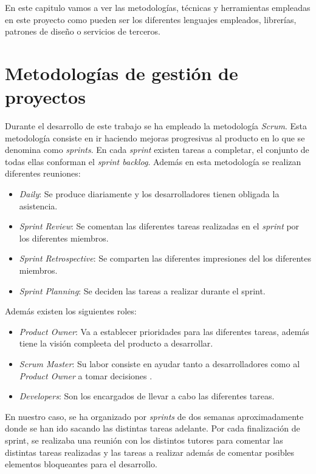 
En este capitulo vamos a ver las metodologías, técnicas y herramientas empleadas en este proyecto como pueden ser los diferentes lenguajes empleados, librerías, patrones de diseño o servicios de terceros.

\section{Metodologías de gestión de proyectos}

Durante el desarrollo de este trabajo se ha empleado la metodología \textit{Scrum}\cite{sachdeva2016scrum}. Esta metodología consiste en ir haciendo mejoras progresivas al producto en lo que se denomina como \textit{sprints}. En cada \textit{sprint} existen tareas a completar, el conjunto de todas ellas conforman el \textit{sprint backlog}. Además en esta metodología se realizan diferentes reuniones:
\begin{itemize}
    \item  \textit{Daily}: Se produce diariamente y los desarrolladores tienen obligada la asistencia.
    \item  \textit{Sprint Review}: Se comentan las diferentes tareas realizadas en el \textit{sprint} por los diferentes miembros.
    \item  \textit{Sprint Retrospective}: Se comparten las diferentes impresiones del los diferentes miembros.
    \item  \textit{Sprint Planning}: Se deciden las tareas a realizar durante el sprint.
\end{itemize}

Además existen los siguientes roles:
\begin{itemize}
    \item  \textit{Product Owner}: Va a establecer prioridades para las diferentes tareas, además tiene la visión compleeta del producto a desarrollar.
    \item  \textit{Scrum Master}: Su labor consiste en ayudar tanto a desarrolladores como al \textit{Product Owner} a tomar decisiones .
    \item  \textit{Developers}: Son los encargados de llevar a cabo las diferentes tareas.
\end{itemize}

En nuestro caso, se ha organizado por \textit{sprints} de dos semanas aproximadamente donde se han ido sacando las distintas tareas adelante. Por cada finalización de sprint, se realizaba una reunión con los distintos tutores para comentar las distintas tareas realizadas y las tareas a realizar además de comentar posibles elementos bloqueantes para el desarrollo.

